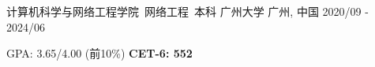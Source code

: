 

\begin{cventries}

  \cventry
    {计算机科学与网络工程学院\ 网络工程\ 本科} %
    {广州大学} %
    {广州, 中国} %
    {2020/09 - 2024/06} %
    {
      \begin{cvitems} %
        \item {GPA: 3.65/4.00 (前10\%) \hspace{1mm} \textbf{CET-6: 552}}
      \end{cvitems}
    }

\end{cventries}
